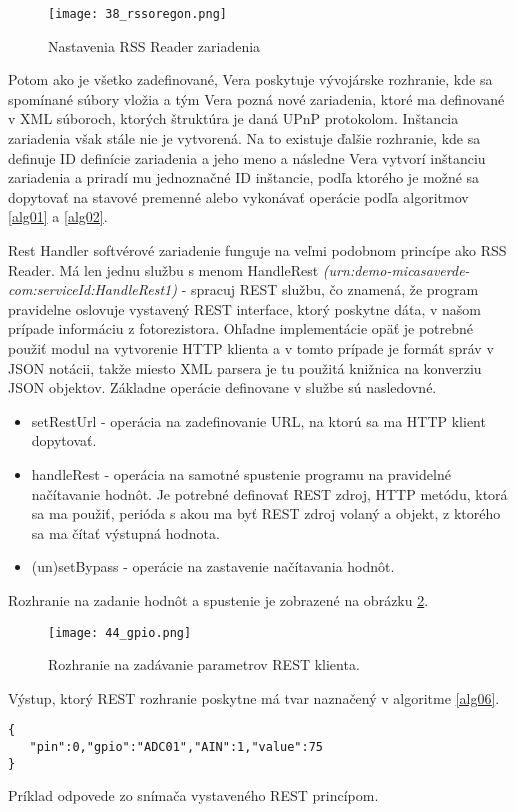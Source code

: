 \begin{figure}[!htbp]
\centering
\texttt{[image: 38\_rssoregon.png]}
\caption{Nastavenia RSS Reader zariadenia}
\label{38_rssoregon}
\end{figure} 
Potom ako je všetko zadefinované, Vera poskytuje vývojárske rozhranie, kde sa spomínané súbory vložia a tým Vera pozná nové zariadenia, ktoré ma definované v XML súboroch, ktorých štruktúra je daná UPnP protokolom. Inštancia zariadenia však stále nie je vytvorená. Na to existuje ďalšie rozhranie, kde sa definuje ID definície zariadenia a jeho meno a následne Vera vytvorí inštanciu zariadenia a priradí mu jednoznačné ID inštancie, podľa ktorého je možné sa dopytovať na stavové premenné alebo vykonávať operácie podľa algoritmov \ref{alg01} a \ref{alg02}.

\indent Rest Handler softvérové zariadenie funguje na veľmi podobnom princípe ako RSS Reader. Má len jednu službu s menom HandleRest \textit{(urn:demo-micasaverde-com:serviceId:HandleRest1)} - spracuj REST službu, čo znamená, že program pravidelne oslovuje vystavený REST interface, ktorý poskytne dáta, v našom prípade informáciu z fotorezistora. Ohľadne implementácie opäť je potrebné použiť modul na vytvorenie HTTP klienta a v tomto prípade je formát správ v JSON notácii, takže miesto XML parsera je tu použitá knižnica \cite{IOT30} na konverziu JSON objektov. Základne operácie definovane v službe sú nasledovné.
\begin{itemize}
\item setRestUrl - operácia na zadefinovanie URL, na ktorú sa ma HTTP klient dopytovať.
\item handleRest - operácia na samotné spustenie programu na pravidelné načítavanie hodnôt. Je potrebné definovať REST zdroj, HTTP metódu, ktorá sa ma použiť, perióda s akou ma byť REST zdroj volaný a objekt, z ktorého sa ma čítať výstupná hodnota.
\item (un)setBypass - operácie na zastavenie načítavania hodnôt.
\end{itemize}
Rozhranie na zadanie hodnôt a spustenie je zobrazené na obrázku \ref{44_gpio}.
\begin{figure}[!htbp]
\centering
\texttt{[image: 44\_gpio.png]}
\caption{Rozhranie na zadávanie parametrov REST klienta.}
\label{44_gpio}
\end{figure} 
Výstup, ktorý REST rozhranie poskytne má tvar naznačený v algoritme \ref{alg06}.
\begin{algorithm}
%
\begin{lstlisting}
{
   "pin":0,"gpio":"ADC01","AIN":1,"value":75
}
\end{lstlisting}
 \caption{Príklad odpovede zo snímača vystaveného REST princípom.}
 \label{alg06}
\end{algorithm}  
